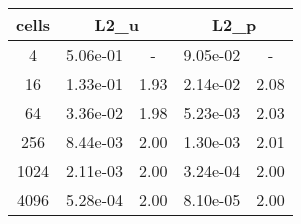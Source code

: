 \documentclass[10pt]{report}
\begin{document}
\begin{table}[H]
\begin{center}
\begin{tabular}{|c|c|c|c|c|} \hline
cells & 
\multicolumn{2}{|c|}{L2_u} & 
\multicolumn{2}{|c|}{L2_p}\\ \hline
4 & 5.06e-01 & - & 9.05e-02 & -\\ \hline
16 & 1.33e-01 & 1.93 & 2.14e-02 & 2.08\\ \hline
64 & 3.36e-02 & 1.98 & 5.23e-03 & 2.03\\ \hline
256 & 8.44e-03 & 2.00 & 1.30e-03 & 2.01\\ \hline
1024 & 2.11e-03 & 2.00 & 3.24e-04 & 2.00\\ \hline
4096 & 5.28e-04 & 2.00 & 8.10e-05 & 2.00\\ \hline
\end{tabular}
\end{center}
\end{table}
\end{document}
